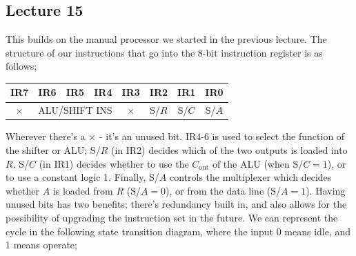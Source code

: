 \documentclass[a4paper, 12pt]{article}
\begin{document}
        \subsection*{Lecture 15}
            This builds on the manual processor we started in the previous lecture. The structure of our instructions that go into the 8-bit instruction register is as follows;
            \begin{center}
                \begin{tabular}{c|c|c|c|c|c|c|c}
                    IR7 & IR6 & IR5 & IR4 & IR3 & IR2 & IR1 &IR0 \\
                    \hline
                    $\times$ & \multicolumn{3}{c|}{ALU/SHIFT INS} & $\times$ & S/$R$ & S/$C$ & S/$A$
                \end{tabular}
            \end{center}
            Wherever there's a $\times$ - it's an unused bit. IR4-6 is used to select the function of the shifter or ALU; S/$R$ (in IR2) decides which of the two outputs is loaded into $R$. S/$C$ (in IR1) decides whether to use the $C_\text{out}$ of the ALU (when S/$C = 1$), or to use a constant logic 1. Finally, S/$A$ controls the multiplexer which decides whether $A$ is loaded from $R$ (S/$A = 0$), or from the data line (S/$A = 1$). Having unused bits has two benefits; there's redundancy built in, and also allows for the possibility of upgrading the instruction set in the future. We can represent the cycle in the following state transition diagram, where the input 0 means idle, and 1 means operate;
            \begin{center}
            \end{center}
\end{document}
